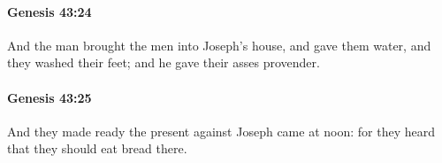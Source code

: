		\paragraph{Genesis 43:24} %
			\label{GENESIS-43-24}

			And the man brought the men into Joseph's house, and gave them water, and they washed their feet; and he gave their asses provender.


		\paragraph{Genesis 43:25} %
			\label{GENESIS-43-25}

			And they made ready the present against Joseph came at noon: for they heard that they should eat bread there.


